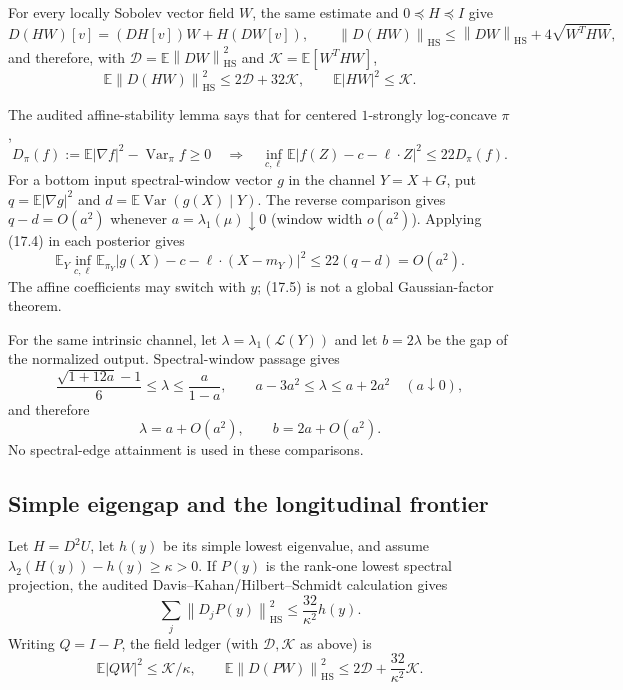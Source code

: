 \documentclass[11pt]{article}
\theoremstyle{definition}
\theoremstyle{remark}
\newcommand{\E}{\mathbb E}
\newcommand{\Var}{\operatorname{Var}}
\newcommand{\HS}{\mathrm{HS}}
\newcommand{\1}{\mathbf 1}
\newcommand{\norm}[1]{\left\lVert #1\right\rVert}
\begin{document}
For every locally Sobolev vector field \(W\), the same estimate and
\(0\preceq H\preceq I\) give
\[
 D(HW)[v]=(D H[v])W+H(DW[v]),\qquad
 \norm{D(HW)}_{\HS}\le\norm{DW}_{\HS}+4\sqrt{W^THW},
\]
and therefore, with
\(\mathcal D=\E\norm{DW}_{\HS}^2\) and
\(\mathcal K=\E[W^THW]\),
\[
 \E\norm{D(HW)}_{\HS}^2\le2\mathcal D+32\mathcal K,
 \qquad \E|HW|^2\le\mathcal K.                     \tag{17.3}
\]

The audited affine-stability lemma says that for centered
\(1\)-strongly log-concave \(\pi\),
\[
 D_\pi(f):=\E|\nabla f|^2-\Var_\pi f\ge0
 \quad\Longrightarrow\quad
 \inf_{c,\ell}\E|f(Z)-c-\ell\cdot Z|^2\le22D_\pi(f). \tag{17.4}
\]
For a bottom input spectral-window vector \(g\) in the channel \(Y=X+G\),
put \(q=\E|\nabla g|^2\) and
\(d=\E\Var(g(X)\mid Y)\).  The reverse comparison gives
\(q-d=O(a^2)\) whenever \(a=\lambda_1(\mu)\downarrow0\) (window width
\(o(a^2)\)).  Applying (17.4) in each posterior gives
\[
 \E_Y\inf_{c,\ell}\E_{\pi_Y}
 |g(X)-c-\ell\cdot(X-m_Y)|^2
 \le22(q-d)=O(a^2).                                 \tag{17.5}
\]
The affine coefficients may switch with \(y\); (17.5) is not a global
Gaussian-factor theorem.

For the same intrinsic channel, let
\(\lambda=\lambda_1(\mathcal L(Y))\) and let \(b=2\lambda\) be the gap of
the normalized output.  Spectral-window passage gives
\[
 \frac{\sqrt{1+12a}-1}{6}\le\lambda\le\frac{a}{1-a},
 \qquad a-3a^2\le\lambda\le a+2a^2\quad(a\downarrow0),
\]
and therefore
\[
 \lambda=a+O(a^2),\qquad b=2a+O(a^2).                 \tag{17.6}
\]
No spectral-edge attainment is used in these comparisons.

\subsection{Simple eigengap and the longitudinal frontier}

Let \(H=D^2U\), let \(h(y)\) be its simple lowest eigenvalue, and assume
\(\lambda_2(H(y))-h(y)\ge\kappa>0\).  If \(P(y)\) is the rank-one lowest
spectral projection, the audited Davis--Kahan/Hilbert--Schmidt calculation
gives
\[
 \sum_j\norm{D_jP(y)}_{\HS}^2\le \frac{32}{\kappa^2}h(y). \tag{17.7}
\]
Writing \(Q=I-P\), the field ledger (with \(\mathcal D,\mathcal K\) as
above) is
\[
 \E|QW|^2\le\mathcal K/\kappa,\qquad
 \E\norm{D(PW)}_{\HS}^2
 \le2\mathcal D+\frac{32}{\kappa^2}\mathcal K.       \tag{17.8}
\]
\end{document}
